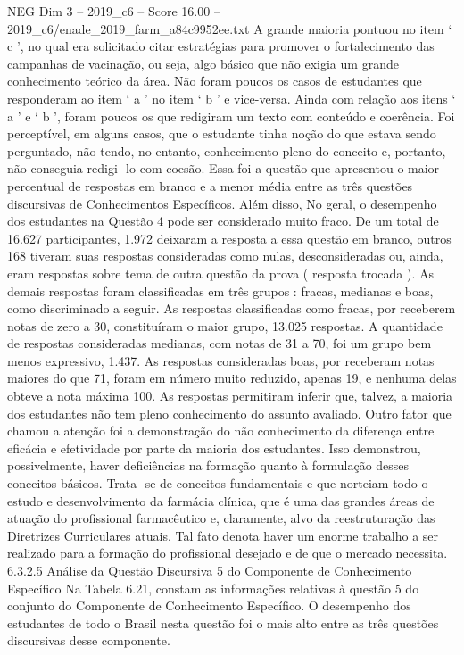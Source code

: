 \begin{textsample}{NEG Dim 3 – 2019\_c6 – Score 16.00 – 2019\_c6/enade\_2019\_farm\_a84c9952ee.txt}
A grande maioria pontuou no item ‘ c ’, no qual era solicitado citar estratégias para promover o fortalecimento das campanhas de vacinação, ou seja, algo básico que não exigia um grande conhecimento teórico da área.
Não foram poucos os casos de estudantes que responderam ao item ‘ a ’ no item ‘ b ’ e vice-versa.
Ainda com relação aos itens ‘ a ’ e ‘ b ’, foram poucos os que redigiram um texto com conteúdo e coerência.
Foi perceptível, em alguns casos, que o estudante tinha noção do que estava sendo perguntado, não tendo, no entanto, conhecimento pleno do conceito e, portanto, não conseguia redigi -lo com coesão.
Essa foi a questão que apresentou o maior percentual de respostas em branco e a menor média entre as três questões discursivas de Conhecimentos Específicos.
Além disso, No geral, o desempenho dos estudantes na Questão 4 pode ser considerado muito fraco.
De um total de 16.627 participantes, 1.972 deixaram a resposta a essa questão em branco, outros 168 tiveram suas respostas consideradas como nulas, desconsideradas ou, ainda, eram respostas sobre tema de outra questão da prova ( resposta trocada ).
As demais respostas foram classificadas em três grupos : fracas, medianas e boas, como discriminado a seguir.
As respostas classificadas como fracas, por receberem notas de zero a 30, constituíram o maior grupo, 13.025 respostas.
A quantidade de respostas consideradas medianas, com notas de 31 a 70, foi um grupo bem menos expressivo, 1.437.
As respostas consideradas boas, por receberam notas maiores do que 71, foram em número muito reduzido, apenas 19, e nenhuma delas obteve a nota máxima 100.
As respostas permitiram inferir que, talvez, a maioria dos estudantes não tem pleno conhecimento do assunto avaliado.
Outro fator que chamou a atenção foi a demonstração do não conhecimento da diferença entre eficácia e efetividade por parte da maioria dos estudantes.
Isso demonstrou, possivelmente, haver deficiências na formação quanto à formulação desses conceitos básicos.
Trata -se de conceitos fundamentais e que norteiam todo o estudo e desenvolvimento da farmácia clínica, que é uma das grandes áreas de atuação do profissional farmacêutico e, claramente, alvo da reestruturação das Diretrizes Curriculares atuais.
Tal fato denota haver um enorme trabalho a ser realizado para a formação do profissional desejado e de que o mercado necessita. 6.3.2.5 Análise da Questão Discursiva 5 do Componente de Conhecimento Específico Na Tabela 6.21, constam as informações relativas à questão 5 do conjunto do Componente de Conhecimento Específico.
O desempenho dos estudantes de todo o Brasil nesta questão foi o mais alto entre as três questões discursivas desse componente.

\end{textsample}
